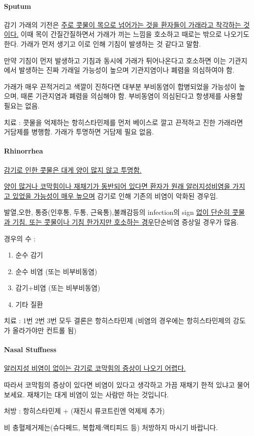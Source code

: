 \paragraph{Sputum}
감기 가래의 기전은 \uline{주로 콧물이 목으로 넘어가는 것을 환자들이 가래라고 착각하는 것이다.} 이때 목이 간질간질하면서 가래가 끼는 느낌을 호소하고 때로는 밖으로 나오기도 한다. 가래가 먼저 생기고 이로 인해 기침이 발생하는 것 같다고 말함. \par
만약 기침이 먼저 발생하고 기침과 동시에 가래가 튀어나온다고 호소하면 이는 기관지에서 발생하는 진짜 가래일 가능성이 높으며 기관지염이나 폐렴을 의심하여야 함.\par
가래가 매우 끈적거리고 색깔이 진하다면 대부분 부비동염이 합병되었을 가능성이 높으며, 때론 기관지염과 폐렴을 의심해야 함. 부비동염이 의심된다고 항생제를 사용할 필요는 없음.\par
치료 : 콧물을 억제하는 항히스타민제를 먼저 베이스로 깔고 끈적하고 진한 가래라면 거담제를 병행함. 가래가 투명하면 거담제 필요 없음.

\paragraph{Rhinorrhea}
\uline{감기로 인한 콧물은 대게 양이 많지 않고 투명함. }\par
\uline{양이 많거나 코막힘이나 재채기가 동반되어 있다면 환자가 원래 알러지성비염을 가지고 있었을 가능성이 매우 높으며} 감기로 인해 기존의 비염이 악화된 경우임.\par

발열,오한, 통증(인후통, 두통, 근육통),불쾌감등의 infection의 sign \uline{없이 단순히 콧물과 기침. 또는 콧물이나 기침 한가지만 호소하는 경우}단순비염 증상일 경우가 많음.\par
경우의 수 : 
\begin{enumerate}\tightlist
\item 순수 감기 
\item 순수 비염 (또는 비부비동염)
\item 감기+비염 (또는 비부비동염)
\item 기타 질환 
\end{enumerate}
치료 : 1번 2번 3번 모두 결론은 항히스타민제 (비염의 경우에는 항히스타민제의 강도가 올라가야만 컨트롤 됨)


\paragraph{Nasal Stuffness}
\uline{알러지성 비염이 없이는 감기로 코막힘의 증상이 나오기 어렵다.}\par
따라서 코막힘의 증상이 있다면 비염이 있다고 생각하고 가끔 재채기 한적 있냐고 물어 보세요. 재채기는 대게 비염이 있는 사람만 하는 것입니다.\par
\begin{mdframed}[linecolor=blue,middlelinewidth=2]
처방 : 항히스타민제 + (재진시 류코트린엔 억제제 추가)\par 
비 충혈제거제는(슈다페드, 복합제:액티피드 등) 처방하지 마시기 바랍니다. 
\end{mdframed}

